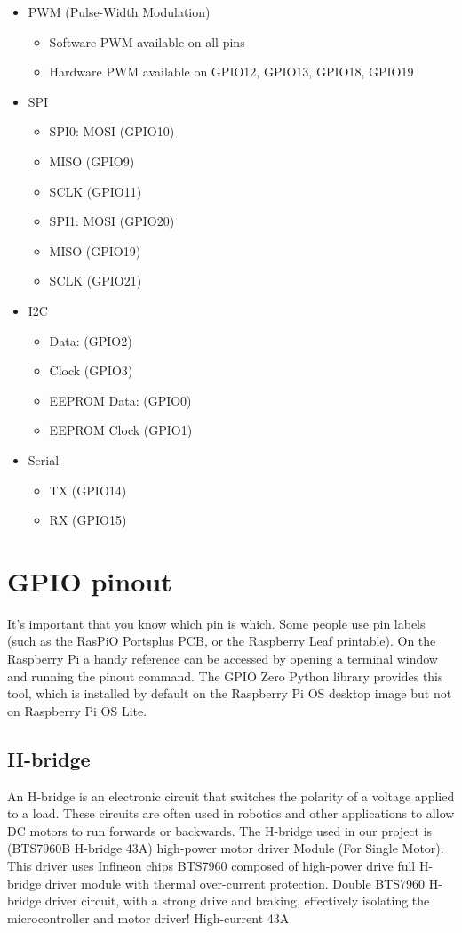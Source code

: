 \begin{itemize}
    \item PWM (Pulse-Width Modulation)
       \begin{itemize}
         \item Software PWM available on all pins
         \item Hardware PWM available on GPIO12, GPIO13, GPIO18, GPIO19
    \end{itemize}
    \item SPI
       \begin{itemize}
         \item SPI0: MOSI (GPIO10)
         \item MISO (GPIO9)
         \item SCLK (GPIO11)
         \item SPI1: MOSI (GPIO20)
         \item MISO (GPIO19)
         \item SCLK (GPIO21)
    \end{itemize}
    \item I2C 
       \begin{itemize}
         \item Data: (GPIO2)
         \item Clock (GPIO3)
         \item EEPROM Data: (GPIO0)
         \item EEPROM Clock (GPIO1)
    \end{itemize}
    \item Serial 
       \begin{itemize}
         \item TX (GPIO14)
         \item RX (GPIO15)
    \end{itemize}
\end{itemize}

\section*{GPIO pinout }
It's important that you know which pin is which. Some people use pin labels (such as the RasPiO Portsplus PCB, or the Raspberry Leaf printable). On the Raspberry Pi a handy reference can be accessed by opening a terminal window and running the pinout command. The GPIO Zero Python library provides this tool, which is installed by default on the Raspberry Pi OS desktop image but not on Raspberry Pi OS Lite.

\subsection{ H-bridge  }
An H-bridge is an electronic circuit that switches the polarity of a voltage applied to a load. These circuits are often used in robotics and other applications to allow DC motors to run forwards or backwards. 
The H-bridge used in our project is (BTS7960B H-bridge 43A) high-power motor driver Module (For Single Motor). This driver uses Infineon chips BTS7960 composed of high-power drive full H-bridge driver module with thermal over-current protection. Double BTS7960 H-bridge driver circuit, with a strong drive and braking, effectively isolating the microcontroller and motor driver! High-current 43A

